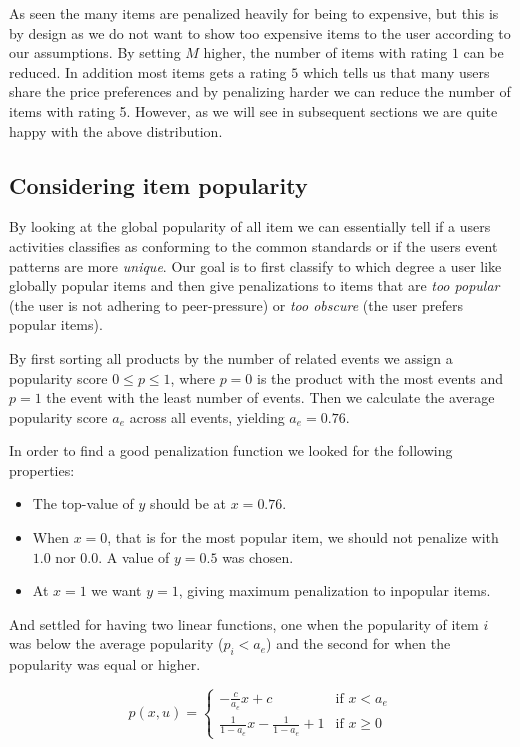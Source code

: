 As seen the many items are penalized heavily for being to expensive, but this
is by design as we do not want to show too expensive items to the user
according to our assumptions. By setting $M$ higher, the number of items with
rating $1$ can be reduced. In addition most items gets a rating $5$ which tells
us that many users share the price preferences and by penalizing harder we can
reduce the number of items with rating 5. However, as we will see in subsequent
sections we are quite happy with the above distribution.

\subsection{Considering item popularity}

By looking at the global popularity of all item we can essentially tell if a
users activities classifies as conforming to the common standards or if the
users event patterns are more \textit{unique}. Our goal is to first classify to
which degree a user like globally popular items and then give penalizations to
items that are \textit{too popular} (the user is not adhering to peer-pressure)
or \textit{too obscure} (the user prefers popular items).

By first sorting all products by the number of related events we assign
a popularity score $0 \leq p \leq 1$, where $p=0$ is the product with the most
events and $p=1$ the event with the least number of events. Then we calculate
the average popularity score $a_e$ across all events, yielding $a_e = 0.76$.

In order to find a good penalization function we looked for the following
properties:

\begin{itemize}
  \item The top-value of $y$ should be at $x = 0.76$.
  \item When $x = 0$, that is for the most popular item, we should not penalize
  with $1.0$ nor $0.0$. A value of $y = 0.5$ was chosen.
  \item At $x = 1$ we want $y = 1$, giving maximum penalization to
  inpopular items.
\end{itemize}

And settled for having two linear functions, one when the popularity of item
$i$ was below the average popularity ($p_i < a_e$) and the second for when the
popularity was equal or higher.

\begin{equation}
  p(x, u) =
    \begin{cases}
      -\frac{c}{a_e}x + c                     & \text{if } x < a_e \\[1.5ex]
      \frac{1}{1-a_e}x - \frac{1}{1-a_e} + 1  & \text{if } x \geq 0
    \end{cases}
\end{equation}

